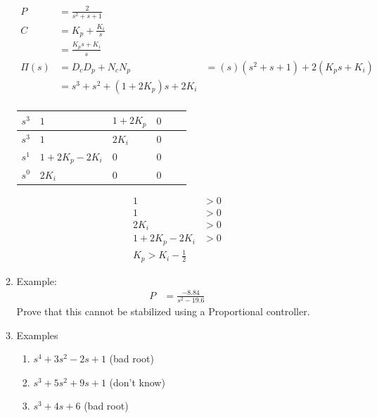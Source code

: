 \begin{enumerate}
\begin{enumerate}
                    \begin{align*}
                        P &= \frac{2}{s^2 + s + 1} \\
                        C &= K_p + \frac{K_i}{s} \\
                        &= \frac{K_p s + K_i}{s} \\
                        \Pi(s) &= D_c D_p + N_c N_p
                        &= (s)(s^2 + s + 1) + 2 (K_p s + K_i) \\
                        &= s^3 + s^2 + (1+2K_p) s + 2K_i \\
                    \end{align*}
                    \begin{table}[h]
                        \centering
                        \begin{tabular}{ | l || l | l | l | l | l | }
                            \hline
                            \hline
                            $s^3$ & $1$ & $1+2K_p$ & $0$ \\ \hline
                            $s^3$ & $1$ & $2K_i$ & $0$ \\ \hline
                            $s^1$ & $1+2K_p - 2 K_i$ & $0$ & $0$ \\ \hline
                            $s^0$ & $2K_i$ & $0$ & $0$ \\ \hline
                        \end{tabular}
                    \end{table}
                    \begin{align*}
                        1 &> 0 \\
                        1 &> 0 \\
                        2K_i &> 0 \\
                        1+ 2K_p - 2K_i &> 0 \\
                        K_p > K_i - \frac{1}{2}
                    \end{align*}

                \item Example:
                    \begin{align*}
                        P &= \frac{-8.84}{s^2 - 19.6}
                    \end{align*}
                    Prove that this cannot be stabilized using a Proportional controller.
                \item Examples
                    \begin{enumerate}
                        \item $s^4 + 3s^2 -2s +1$ (bad root)
                        \item $s^3 + 5s^2 + 9s + 1$ (don't know)
                        \item $s^3 + 4s + 6$ (bad root)
                    \end{enumerate}


\end{enumerate}
\end{enumerate}
